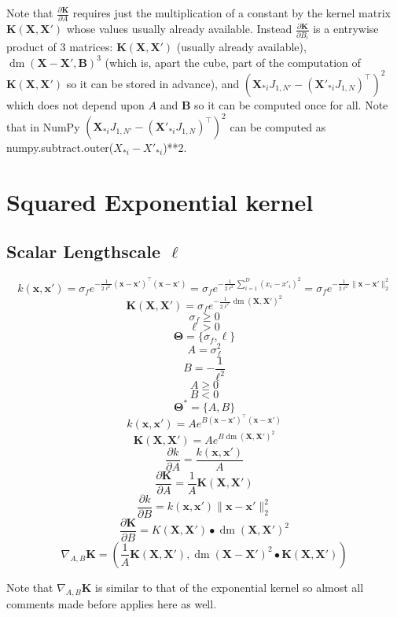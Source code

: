 \documentclass[a4paper,11pt]{article}
\newcommand\x{{\mathbf x}}
\newcommand\X{{\mathbf X}}
\newcommand\K{{\mathbf K}}
\DeclareMathOperator*{\dm}{dm}
\begin{document}
Note that $\frac{\partial \K}{\partial A}$ requires just the
multiplication of a constant by the kernel matrix $\K(\X,\X')$ whose
values usually already available. Instead $\frac{\partial \K}{\partial
  B_i}$ is a entrywise product of 3 matrices: $\K(\X,\X')$ (usually
already available), $\dm(\X-\X',\mathbf{B})^3$ (which is, apart the
cube, part of the computation of $\K(\X,\X')$ so it can be stored in
advance), and $(\X_{*i}J_{1,N'}- (\X'_{*i}J_{1,N})^{\top})^2$ which
does not depend upon $A$ and $\mathbf{B}$ so it can be computed once
for all. Note that in NumPy $(\X_{*i}J_{1,N'}-
(\X'_{*i}J_{1,N})^{\top})^2$ can be computed as {\ttfamily
  numpy.subtract.outer($X_{*i}-X'_{*i}$)**2}.

\section{Squared Exponential kernel}

\subsection{Scalar Lengthscale $\ell$}
$$k(\x,\x') = \sigma_f e^{-\frac{1}{2\ell^2} (\x-\x')^{\top}(\x-\x')}
  = \sigma_f e^{-\frac{1}{2\ell^2} \sum_{i=1}^D (x_i - x'_i)^2} =
  \sigma_f e^{-\frac{1}{2\ell^2} \|\x-\x'\|_2^2}$$ 
$$\K(\X,\X') = \sigma_f e^{-\frac{1}{2\ell^2} \dm(\X,\X')^2}$$
$$\sigma_f \ge 0$$
$$\ell > 0$$
$$\mathbf{\Theta} = \{ \sigma_f, \ell \}$$
$$A = \sigma_f^2$$
$$B = -\frac{1}{\ell^2}$$
$$A \ge 0$$
$$B < 0$$
$$\mathbf{\Theta}^* = \{ A, B\}$$
$$k(\x,\x') = A e^{B (\x-\x')^{\top}(\x-\x')}$$
$$\K(\X,\X') = A e^{B \dm(\X,\X')^2}$$
$$\frac{\partial k}{\partial A} = \frac{k(\x,\x')}{A}$$
$$\frac{\partial \K}{\partial A} = \frac{1}{A}\K(\X,\X')$$
$$\frac{\partial k}{\partial B} = k(\x,\x') \|\x-\x'\|_2^2$$
$$\frac{\partial \K}{\partial B} = K(\X,\X') \bullet \dm(\X,\X')^2$$
$$\nabla_{A,B} \K = (\frac{1}{A} \K(\X,\X'), \dm(\X-\X')^2 \bullet
\K(\X,\X'))$$

Note that $\nabla_{A,B} \K$ is similar to that of the exponential
kernel so almost all comments made before applies here as well.
\end{document}
